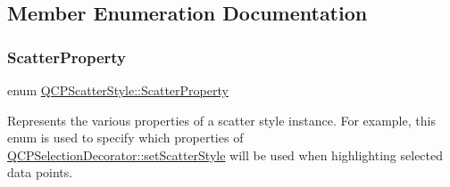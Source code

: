 \subsection{Member Enumeration Documentation}
\mbox{\label{class_q_c_p_scatter_style_a8974f6a20f8f6eea7781f0e6af9deb46}} 
\subsubsection{\texorpdfstring{ScatterProperty}{ScatterProperty}}
{\footnotesize\ttfamily enum \mbox{\hyperlink{class_q_c_p_scatter_style_a8974f6a20f8f6eea7781f0e6af9deb46}{Q\+C\+P\+Scatter\+Style\+::\+Scatter\+Property}}}

Represents the various properties of a scatter style instance. For example, this enum is used to specify which properties of \mbox{\hyperlink{class_q_c_p_selection_decorator_ab403a613289714ff4fd4a0c0371ab116}{Q\+C\+P\+Selection\+Decorator\+::set\+Scatter\+Style}} will be used when highlighting selected data points.

